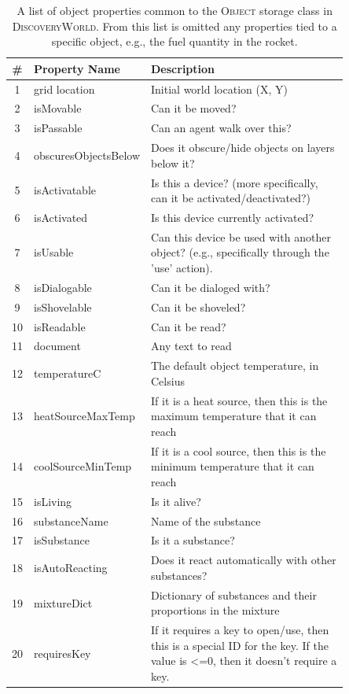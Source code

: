 \documentclass{article}
\newcommand{\env}{\textsc{DiscoveryWorld}\xspace}
\begin{document}
\begin{table}[t!]
\centering
\scriptsize
\caption{A list of object properties common to the \textsc{Object} storage class in \env. From this list is omitted any properties tied to a specific object, e.g., the fuel quantity in the rocket.}
\label{tab:object-properties}
\begin{tabular}{cp{0.20\linewidth}p{0.65\linewidth}}
\toprule
\textbf{\#} & \textbf{Property Name} & \textbf{Description} \\
\midrule
1 & grid location & Initial world location (X, Y) \\
2 & isMovable & Can it be moved? \\
3 & isPassable & Can an agent walk over this? \\
4 & obscuresObjectsBelow & Does it obscure/hide objects on layers below it? \\
5 & isActivatable & Is this a device? (more specifically, can it be activated/deactivated?) \\
6 & isActivated & Is this device currently activated? \\
7 & isUsable & Can this device be used with another object? (e.g., specifically through the 'use' action). \\
8 & isDialogable & Can it be dialoged with? \\
9 & isShovelable & Can it be shoveled? \\
10 & isReadable & Can it be read? \\
11 & document & Any text to read \\
12 & temperatureC & The default object temperature, in Celsius \\
13 & heatSourceMaxTemp & If it is a heat source, then this is the maximum temperature that it can reach \\
14 & coolSourceMinTemp & If it is a cool source, then this is the minimum temperature that it can reach \\
15 & isLiving & Is it alive? \\
16 & substanceName & Name of the substance \\
17 & isSubstance & Is it a substance? \\
18 & isAutoReacting & Does it react automatically with other substances? \\
19 & mixtureDict & Dictionary of substances and their proportions in the mixture \\
20 & requiresKey & If it requires a key to open/use, then this is a special ID for the key. If the value is <=0, then it doesn't require a key. \\

\end{tabular}
\end{table}
\end{document}
